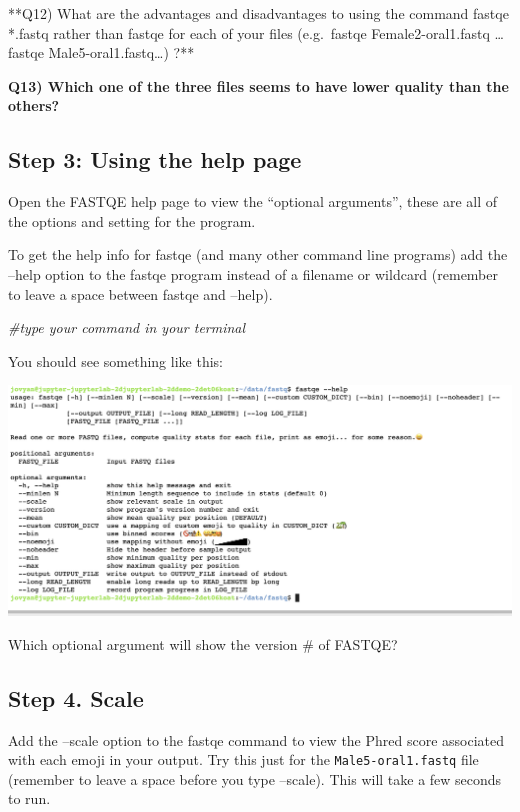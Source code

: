 \documentclass[
]{article}
\newenvironment{Shaded}{\begin{snugshade}}{\end{snugshade}}
\newcommand{\CommentTok}[1]{\textcolor[rgb]{0.56,0.35,0.01}{\textit{#1}}}
\begin{document}
**Q12) What are the advantages and disadvantages to using the command
fastqe *.fastq rather than fastqe for each of your files (e.g.~fastqe
Female2-oral1.fastq \ldots{} fastqe Male5-oral1.fastq\ldots) ?**

\textbf{Q13) Which one of the three files seems to have lower quality
than the others?}

\hypertarget{step-3-using-the-help-page}{%
\subsection{Step 3: Using the help
page}\label{step-3-using-the-help-page}}

Open the FASTQE help page to view the ``optional arguments'', these are
all of the options and setting for the program.

To get the help info for fastqe (and many other command line programs)
add the --help option to the fastqe program instead of a filename or
wildcard (remember to leave a space between fastqe and --help).

\begin{Shaded}
\begin{Highlighting}[]
\CommentTok{\#type your command in your terminal}
\end{Highlighting}
\end{Shaded}

You should see something like this:

\includegraphics{images/fastqe_help.png}

Which optional argument will show the version \# of FASTQE?

\hypertarget{step-4.-scale}{%
\subsection{Step 4. Scale}\label{step-4.-scale}}

Add the --scale option to the fastqe command to view the Phred score
associated with each emoji in your output. Try this just for the
\texttt{Male5-oral1.fastq} file (remember to leave a space before you
type --scale). This will take a few seconds to run.
\end{document}
